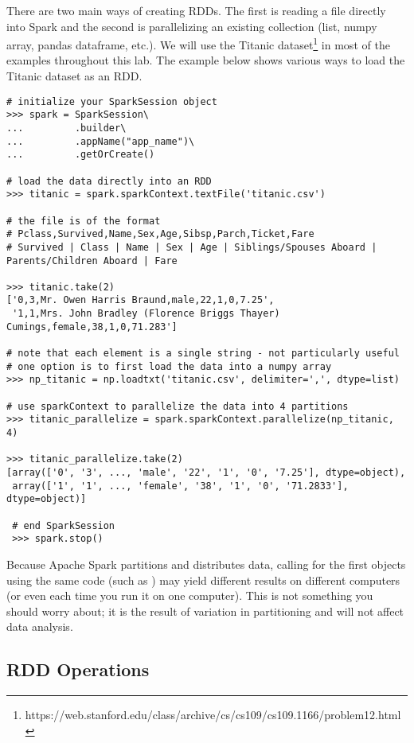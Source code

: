 There are two main ways of creating RDDs. 
The first is reading a file directly into Spark and the second is parallelizing an existing collection (list, numpy array, pandas dataframe, etc.). 
We will use the Titanic dataset\footnote{https://web.stanford.edu/class/archive/cs/cs109/cs109.1166/problem12.html} in most of the examples throughout this lab.  
The example below shows various ways to load the Titanic dataset as an RDD.

\begin{lstlisting}
# initialize your SparkSession object
>>> spark = SparkSession\
...         .builder\
...         .appName("app_name")\
...         .getOrCreate()

# load the data directly into an RDD
>>> titanic = spark.sparkContext.textFile('titanic.csv')

# the file is of the format
# Pclass,Survived,Name,Sex,Age,Sibsp,Parch,Ticket,Fare
# Survived | Class | Name | Sex | Age | Siblings/Spouses Aboard | Parents/Children Aboard | Fare

>>> titanic.take(2)
['0,3,Mr. Owen Harris Braund,male,22,1,0,7.25',
 '1,1,Mrs. John Bradley (Florence Briggs Thayer) Cumings,female,38,1,0,71.283']

# note that each element is a single string - not particularly useful
# one option is to first load the data into a numpy array
>>> np_titanic = np.loadtxt('titanic.csv', delimiter=',', dtype=list)

# use sparkContext to parallelize the data into 4 partitions
>>> titanic_parallelize = spark.sparkContext.parallelize(np_titanic, 4)

>>> titanic_parallelize.take(2)
[array(['0', '3', ..., 'male', '22', '1', '0', '7.25'], dtype=object),
 array(['1', '1', ..., 'female', '38', '1', '0', '71.2833'], dtype=object)]
 
 # end SparkSession
 >>> spark.stop()
\end{lstlisting}

\begin{warn}
Because Apache Spark partitions and distributes data, calling for the first  objects using the same code (such as ) may yield different results on different computers (or even each time you run it on one computer). 
This is not something you should worry about; it is the result of variation in partitioning and will not affect data analysis.
\end{warn}

\subsection*{RDD Operations}
